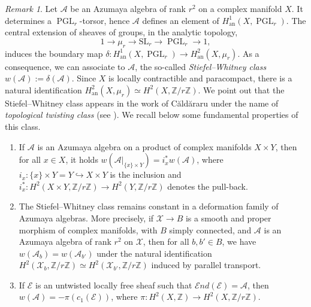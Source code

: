 \documentclass[12pt,a4paper]{amsart}
\theoremstyle{plain}
\theoremstyle{definition}
\theoremstyle{remark}
\newtheorem{rmk}[thm]{Remark}
\def\SL{\mathrm{SL}}
\def\H{H}
\def\PGL{\operatorname{PGL}}
\newcommand{\cc}{c}
\begin{document}
\begin{rmk}\label{stiefel-whitney}
    Let $\mathcal{A}$ be an Azumaya algebra of rank $r^2$ on a complex manifold $X$. It determines a $\PGL_r$-torsor, hence $\mathcal{A}$ defines an element of $\H_{\mathrm{an}}^1(X,\PGL_r)$. The central extension of sheaves of groups, in the analytic topology,
    \[
        1 \rightarrow \mu_r \rightarrow \SL_r \rightarrow \PGL_r \rightarrow 1,
    \]
    induces the boundary map $\delta\colon \H_{\mathrm{an}}^1(X,\PGL_r)\rightarrow \H_{\mathrm{an}}^2(X,\mu_r)$. As a consequence, we can associate to $\mathcal{A}$, the so-called \textit{Stiefel--Whitney class} $w(\mathcal{A}):=\delta(\mathcal{A})$. Since $X$ is locally contractible and paracompact, there is a natural identification  $\H_{\mathrm{an}}^2(X,\mu_r)\simeq \H^2(X,\mathbb{Z}/r\mathbb{Z})$. We point out that the Stiefel--Whitney class appears in the work of C\u{a}ld\u{a}raru under the name of \textit{topological twisting class} (see \cite[Section 4]{caldararu-nonfine-k3}).
    We recall below some fundamental properties of this class.
    \begin{enumerate}
        \item If $\mathcal{A}$ is an Azumaya algebra on a product of complex manifolds $X\times Y$, then for all $x\in X$, it holds $w(\mathcal{A}|_{\{x\}\times Y})=i_x^{*}w(\mathcal{A})$, where $i_x\colon \{x\}\times Y=Y\hookrightarrow X\times Y$ is the inclusion and $i_x^*\colon \H^2(X\times Y,\mathbb{Z}/r\mathbb{Z})\rightarrow \H^2(Y,\mathbb{Z}/r\mathbb{Z})$ denotes the pull-back.
        \item The Stiefel--Whitney class remains constant in a deformation family of Azumaya algebras. More precisely, if $\mathcal{X}\rightarrow B$ is a smooth and proper morphism of complex manifolds, with $B$ simply connected, and $\mathcal{A}$ is an Azumaya algebra of rank $r^2$ on $\mathcal{X}$, then for all $b,b'\in B$, we have $w(\mathcal{A}_b)=w(\mathcal{A}_{b'})$ under the natural identification $\H^2(\mathcal{X}_b,\mathbb{Z}/r\mathbb{Z})\simeq \H^2(\mathcal{X}_{b'},\mathbb{Z}/r\mathbb{Z})$ induced by parallel transport.

        \item  If $\mathcal{E}$ is an untwisted locally free sheaf such that $\mathcal{E}nd(\mathcal{E})=\mathcal{A}$, then $w(\mathcal{A})=-\pi(\cc_1(\mathcal{E}))$, where $\pi\colon \H^2(X,\mathbb{Z})\rightarrow \H^2(X,\mathbb{Z}/r\mathbb{Z})$.
    \end{enumerate} 
\end{rmk}
\end{document}
